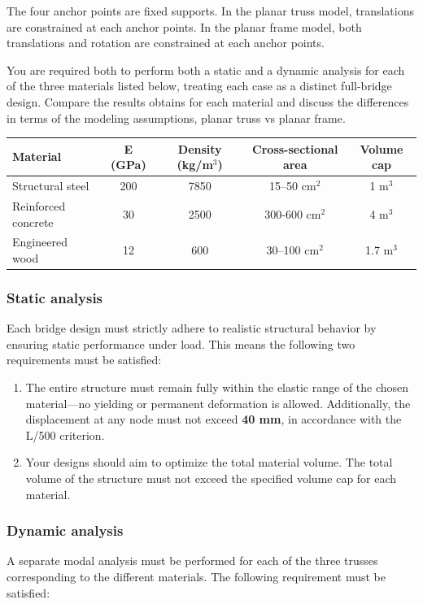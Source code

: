 \documentclass[12pt]{article}
\begin{document}
The four anchor points are fixed supports. In the planar truss model, translations are constrained at each anchor points. In the planar frame model, both translations and rotation are constrained at each anchor points.

You are required both to perform both a static and a dynamic analysis for each of the three materials listed below, treating each case as a distinct full-bridge design. Compare the results obtains for each material and discuss the differences in terms of the modeling assumptions, planar truss vs planar frame.

\begin{center}
  \begin{tabular}{l|c|c|c|c}
    {Material}          & {E (GPa)} & {Density (kg/m$^3$)} & {Cross-sectional area} & {Volume cap} \\
    \hline
    Structural steel    & 200       & 7850                 & 15–50 cm$^2$           & 1 m$^3$      \\
    Reinforced concrete & 30        & 2500                 & 300-600 cm$^2$         & 4 m$^3$      \\
    Engineered wood     & 12        & 600                  & 30–100 cm$^2$          & 1.7 m$^3$    \\
  \end{tabular}
\end{center}

\subsubsection*{Static analysis}
Each bridge design must strictly adhere to realistic structural behavior by ensuring static performance under load. This means the following two requirements must be satisfied:
\begin{enumerate}
  \item The entire structure must remain fully within the elastic range of the chosen material—no yielding or permanent deformation is allowed. Additionally, the displacement at any node must not exceed \textbf{40 mm}, in accordance with the L/500 criterion.
  \item Your designs should aim to optimize the total material volume. The total volume of the structure must not exceed the specified volume cap for each material.
\end{enumerate}

\subsubsection*{Dynamic analysis}
A separate modal analysis must be performed for each of the three trusses corresponding to the different materials. The following requirement must be satisfied:
\end{document}
